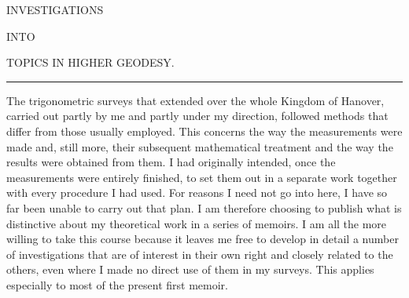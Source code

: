 \renewcommand{\Article}[1]{\par\medskip\Needspace{4\baselineskip}\pdfbookmark[1]{Art. #1}{geodaesie1-art-#1}\centerline{\textbf{#1.}}\nobreak\smallskip}
\begin{center}
INVESTIGATIONS\par\bigskip
INTO\par\bigskip
{\large TOPICS IN HIGHER GEODESY.}\par\medskip
\rule{.65in}{.3pt}
\end{center}
\noindent\hspace*{\parindent}The trigonometric surveys that extended over the whole Kingdom of Hanover, carried out partly by me and partly under my direction, followed methods that differ from those usually employed. This concerns the way the measurements were made and, still more, their subsequent mathematical treatment and the way the results were obtained from them. I had originally intended, once the measurements were entirely finished, to set them out in a separate work together with every procedure I had used. For reasons I need not go into here, I have so far been unable to carry out that plan. I am therefore choosing to publish what is distinctive about my theoretical work in a series of memoirs. I am all the more willing to take this course because it leaves me free to develop in detail a number of investigations that are of interest in their own right and closely related to the others, even where I made no direct use of them in my surveys. This applies especially to most of the present first memoir.
